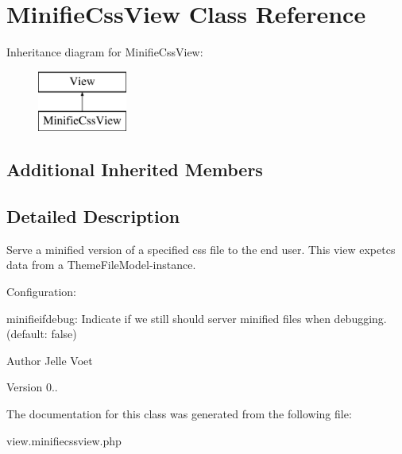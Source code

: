 \hypertarget{class_minifie_css_view}{\section{Minifie\-Css\-View Class Reference}
\label{class_minifie_css_view}
}
Inheritance diagram for Minifie\-Css\-View\-:\begin{figure}[H]
\begin{center}
\leavevmode
\includegraphics[height=2.000000cm]{class_minifie_css_view}
\end{center}
\end{figure}
\subsection*{Additional Inherited Members}


\subsection{Detailed Description}
Serve a minified version of a specified css file to the end user. This view expetcs data from a Theme\-File\-Model-\/instance.

Configuration\-:
\begin{DoxyItemize}
\item minifieifdebug\-: Indicate if we still should server minified files when debugging. (default\-: false)
\end{DoxyItemize}

\begin{DoxyAuthor}{Author}
Jelle Voet 
\end{DoxyAuthor}
\begin{DoxyVersion}{Version}
0.. 
\end{DoxyVersion}


The documentation for this class was generated from the following file\-:\begin{DoxyCompactItemize}
\item 
view.\-minifiecssview.\-php\end{DoxyCompactItemize}
